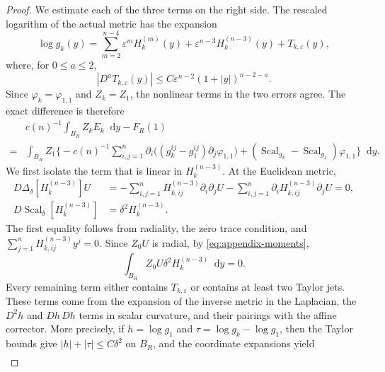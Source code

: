 \documentclass[11pt]{article}
\numberwithin{equation}{section}
\theoremstyle{remark}
\newcommand{\dd}{\mathop{}\!\mathrm{d}}
\begin{document}
\begin{proof}
We estimate each of the three terms on the
right side.  The rescaled logarithm of the
actual metric has the expansion
{
\begin{equation*}
 \log g_k(y)=\sum_{m=2}^{n-4}\varepsilon^mH_k^{(m)}(y)
 +\varepsilon^{n-3}H_k^{(n-3)}(y)+T_{k,\varepsilon}(y),
\end{equation*}
}
 where, for $0\le a\le2$,
{
\begin{equation*}
 |D^aT_{k,\varepsilon}(y)|
 \le C\varepsilon^{n-2}(1+|y|)^{n-2-a}.
\end{equation*}
}
 Since $\varphi_k=\varphi_{1,1}$ and $Z_k=Z_1$, the nonlinear terms in
the two errors agree.  The exact difference is therefore
{
\begin{equation*}
\begin{aligned}
 &c(n)^{-1}\int_{B_R}Z_kE_k\dd y-F_R(1)\\
 {}={}&\int_{B_R}Z_1\biggl\{
 -c(n)^{-1}\sum_{i,j=1}^n\partial_i
 \bigl((g_k^{ij}-g_1^{ij})\partial_j\varphi_{1,1}\bigr)
 +(\operatorname{Scal}_{g_k}-\operatorname{Scal}_{g_1})\varphi_{1,1}\biggr\}\dd y.
\end{aligned}
\end{equation*}
}
 We first isolate the term that is linear in $H_k^{(n-3)}$.  At the
Euclidean metric,
{
\begin{equation*}
\begin{aligned}
 D\Delta_\delta[H_k^{(n-3)}]U
 &=-\sum_{i,j=1}^nH_{k,ij}^{(n-3)}\partial_i\partial_jU
   -\sum_{i,j=1}^n\partial_iH_{k,ij}^{(n-3)}\partial_jU=0,\\
 D\!\operatorname{Scal}_\delta[H_k^{(n-3)}]
 &=\delta^2H_k^{(n-3)}.
\end{aligned}
\end{equation*}
}
The first equality follows from radiality, the zero trace condition, and
$\sum_{j=1}^nH_{k,ij}^{(n-3)}y^j=0$.  Since $Z_0U$ is radial,
{by \eqref{eq:appendix-moments},}
{
\begin{equation*}
 \int_{B_R}Z_0U\delta^2H_k^{(n-3)}\dd y=0.
\end{equation*}
}
Every remaining term either contains $T_{k,\varepsilon}$ or contains
at least two Taylor jets.  These terms come from the expansion of the
inverse metric in the Laplacian, the  $D^2h$ and $Dh\,Dh$ terms in scalar
curvature, and their pairings with the affine corrector.  More precisely,
if $h=\log g_1$ and $\tau=\log g_k-\log g_1$, then
the Taylor bounds give \(|h|+|\tau|\le C\delta^2\) on \(B_R\), and the
coordinate expansions yield
{
\begin{equation*}
\begin{aligned}

\end{aligned}
\end{equation*}}
\end{proof}
\end{document}
